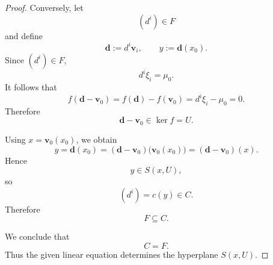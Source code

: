 \documentclass[12pt]{article}
\begin{document}
\begin{proof}
Conversely, let
\[
(d^i)\in F
\]
and define
\[
\mathbf d:=d^i\mathbf v_i,
\qquad
y:=\mathbf d(x_0).
\]
Since $(d^i)\in F$,
\[
d^i\xi_i=\mu_0.
\]
It follows that
\[
f(\mathbf d-\mathbf v_0)
 =f(\mathbf d)-f(\mathbf v_0)
 =d^i\xi_i-\mu_0
 =0.
\]
Therefore
\[
\mathbf d-\mathbf v_0\in\ker f=U.
\]

Using $x=\mathbf v_0(x_0)$, we obtain
\[
y
 =\mathbf d(x_0)
 =(\mathbf d-\mathbf v_0)\bigl(\mathbf v_0(x_0)\bigr)
 =(\mathbf d-\mathbf v_0)(x).
\]
Hence
\[
y\in S(x,U),
\]
so
\[
(d^i)=c(y)\in C.
\]
Therefore
\[
F\subseteq C.
\]

We conclude that
\[
C=F.
\]
Thus the given linear equation determines the hyperplane $S(x,U)$.
\end{proof}
\end{document}
